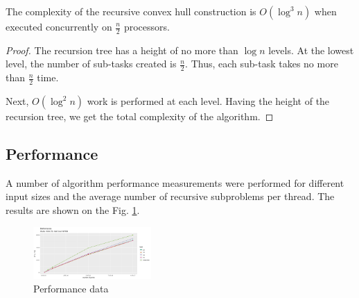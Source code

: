 \documentclass[sigconf]{acmart}
\begin{document}
	\begin{theorem}
		The complexity of the recursive convex hull construction is $O(\log^3n)$ when executed concurrently on $\frac{n}{2}$ processors.
	\end{theorem}

	\begin{proof}
		The recursion tree has a height of no more than $\log n$ levels. At the lowest level, the number of sub-tasks created is $\frac{n}{2}$. Thus, each sub-task takes no more than $\frac{n}{2}$ time.
		
		Next, $O(\log^2 n)$ work is performed at each level. Having the height of the recursion tree, we get the total complexity of the algorithm.
	\end{proof}	


\subsection{Performance}


	A number of algorithm performance measurements were performed for different input sizes and the average number of recursive subproblems per thread. The results are shown on the Fig. \ref{fig:performance}.

	\begin{figure}[h]
		\centering
		\includegraphics[width=0.4\textwidth,height=0.2\textheight]{performance}
		\caption{Performance data}
		\label{fig:performance}
	\end{figure}
\end{document}
